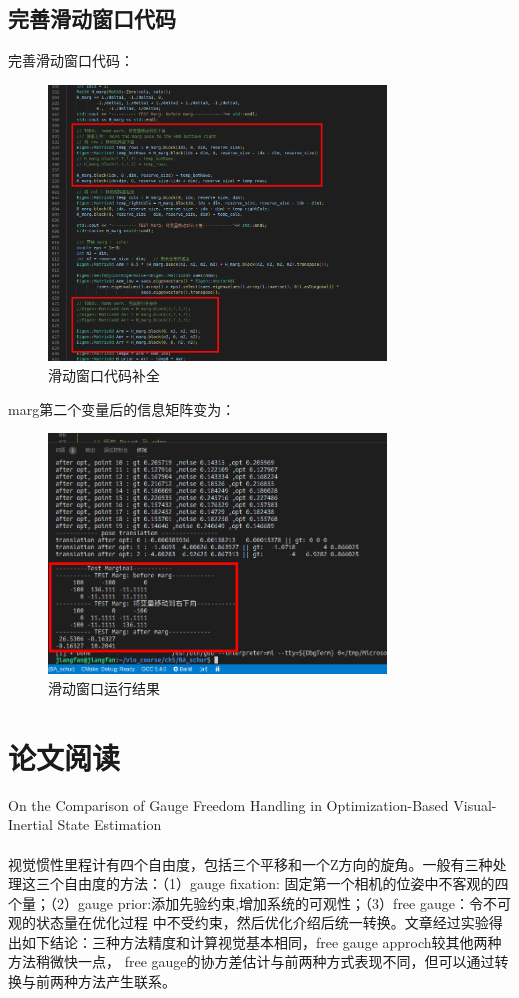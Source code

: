 \documentclass[UTF8]{ctexart}
\begin{document}
\subsection{完善滑动窗口代码}
\indent 完善滑动窗口代码：\\
\begin{figure}[H]
\centering
\includegraphics[width=0.8\textwidth]{1.2.1.jpg}    
\caption{滑动窗口代码补全}
\label{img0}
\end{figure}
\indent marg第二个变量后的信息矩阵变为：\\
\begin{figure}[H]
\centering
\includegraphics[width=0.8\textwidth]{1_2_1.jpg}    
\caption{滑动窗口运行结果}
\label{img0}
\end{figure}

\section{论文阅读}
\indent On the Comparison of Gauge Freedom Handling in
Optimization-Based Visual-Inertial State Estimation\\
\\
\indent 视觉惯性里程计有四个自由度，包括三个平移和一个Z方向的旋角。一般有三种处理这三个自由度的方法：（1）gauge fixation:
固定第一个相机的位姿中不客观的四个量；（2）gauge prior:添加先验约束,增加系统的可观性；（3）free gauge：令不可观的状态量在优化过程
中不受约束，然后优化介绍后统一转换。文章经过实验得出如下结论：三种方法精度和计算视觉基本相同，free gauge approch较其他两种方法稍微快一点，
free gauge的协方差估计与前两种方式表现不同，但可以通过转换与前两种方法产生联系。\\
\end{document}

